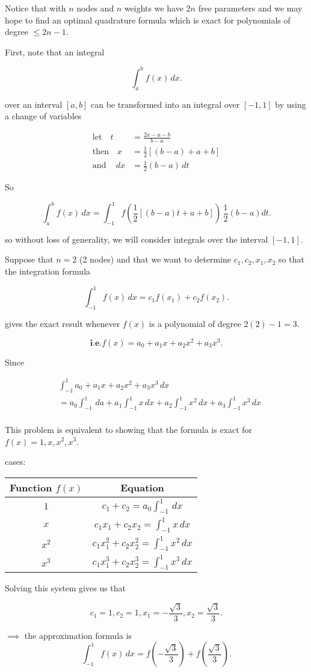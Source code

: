 \documentclass[12pt]{article}
\newcommand{\ie}{\textbf{i.e.}\xspace}
\begin{document}
Notice that with $n$ nodes and $n$ weights we have $2n$ free parameters and we
may hope to find an optimal quadrature formula which is exact for polynomials of
degree $\leq 2n-1$.

First, note that an integral

\[
\int_{a}^{b} f(x) \, dx
.\]

over an interval $[a,b]$ can be transformed into an integral over $[-1, 1]$ by
using a change of variables

\begin{align*}
\text{let}\quad t &= \frac{2x-a-b}{b-a} \\
\text{then}\quad  x &= \frac{1}{2}[(b-a) + a + b] \\
\text{and} \quad \,dx &= \frac{1}{2}(b-a) \,dt
\end{align*}

So 

\[
  \int_{a}^{b} f(x) \, dx = \int_{-1}^{1} f(\frac{1}{2}[(b-a)t + a+b]) \,
  \frac{1}{2}(b-a)dt
.\]

so without loss of generality, we will consider integrals over the interval $[-1,1]$.

Suppose that $n=2$ (2 nodes) and that we want to determine $c_1, c_2, x_1, x_2$
so that the integration formula

\[
\int_{-1}^{1} f(x) \, dx = c_1 f(x_1) + c_2 f(x_2)
.\]

gives the exact result whenever $f(x)$ is a polynomial of degree $2(2)-1 =3$.

\[
\ie f(x) = a_0 + a_1 x + a_2 x^2 + a_3 x^3
.\]

Since 

\begin{align*}
&\int_{-1}^{1} a_0 + a_1 x + a_2 x^2 + a_3x^3 \, dx  \\
&= a_0 \int_{-1}^{1}  \, da + a_1 \int_{-1}^{1} x \, dx + a_2 \int_{-1}^{1} x^2 \, dx + a_3 \int_{-1}^{1} x^3 \, dx \\
\end{align*}

This problem is equivalent to showing that the formula is exact for $f(x) = 1,
x, x^2, x^3$.

cases:

\begin{center}
  \begin{tabular}{c|c}
    Function $f(x)$ & Equation \\
    \hline
    $1$ & $c_1 + c_2 = a_0 \int_{-1}^{1} \, dx$ \\
    $x$ & $c_1x_1 + c_2x_2 = \int_{-1}^{1} x \, dx$ \\
    $x^2$ & $c_1x_1^2 + c_2x_2^2 = \int_{-1}^{1} x^2 \, dx$ \\
    $x^3$ & $c_1x_1^3 + c_2x_2^3 = \int_{-1}^{1} x^3 \, dx$ \\
  \end{tabular}
\end{center}

Solving this system gives us that

\[
c_1 = 1, c_2 = 1, x_1 = - \frac{\sqrt{3}}{3}, x_2 = \frac{\sqrt{3}}{3}
.\]

$\implies$ the approximation formula is 
\[
  \int_{-1}^{1} f(x) \, dx = f\left(-\frac{\sqrt{3}}{3}\right) +
  f\left(\frac{\sqrt{3}}{3}\right)
.\]
\end{document}
